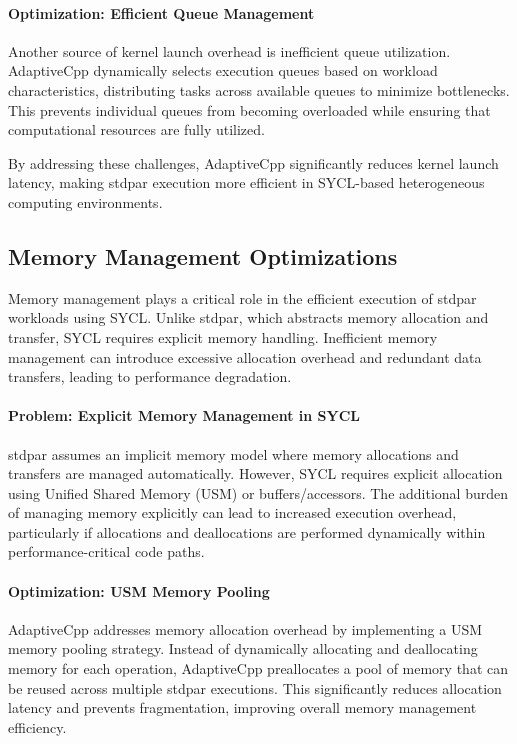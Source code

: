 \paragraph{Optimization: Efficient Queue Management}
Another source of kernel launch overhead is inefficient queue utilization. AdaptiveCpp dynamically selects
execution queues based on workload characteristics, distributing tasks across available queues to minimize
bottlenecks. This prevents individual queues from becoming overloaded while ensuring that computational
resources are fully utilized.

By addressing these challenges, AdaptiveCpp significantly reduces kernel launch latency, making stdpar
execution more efficient in SYCL-based heterogeneous computing environments.

\subsection{Memory Management Optimizations}
\label{sec:memory_management_optimizations}

Memory management plays a critical role in the efficient execution of stdpar workloads using SYCL. Unlike
stdpar, which abstracts memory allocation and transfer, SYCL requires explicit memory handling. Inefficient
memory management can introduce excessive allocation overhead and redundant data transfers, leading to
performance degradation.

\paragraph{Problem: Explicit Memory Management in SYCL}
stdpar assumes an implicit memory model where memory allocations and transfers are managed automatically.
However, SYCL requires explicit allocation using Unified Shared Memory (USM) or buffers/accessors. The
additional burden of managing memory explicitly can lead to increased execution overhead, particularly if
allocations and deallocations are performed dynamically within performance-critical code paths.

\paragraph{Optimization: USM Memory Pooling}
AdaptiveCpp addresses memory allocation overhead by implementing a USM memory pooling strategy. Instead
of dynamically allocating and deallocating memory for each operation, AdaptiveCpp preallocates a pool of
memory that can be reused across multiple stdpar executions. This significantly reduces allocation latency
and prevents fragmentation, improving overall memory management efficiency.

